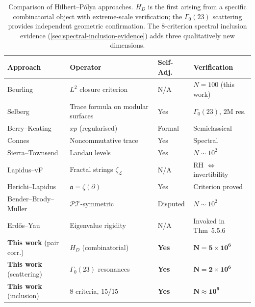\documentclass[11pt,a4paper]{article}
\theoremstyle{plain}
\theoremstyle{remark}
\begin{document}
\begin{table}[H]
\centering\small
\begin{tabular}{@{}llll@{}}
\toprule
Approach & Operator & Self-Adj. & Verification\\
\midrule
Beurling~\cite{beurling1955} & $L^2$ closure criterion & N/A & $N{=}100$ (this work)\\
Selberg~\cite{selberg1956} & Trace formula on modular surfaces & Yes & $\Gamma_0(23)$, $2\mathrm{M}$ res.\\
Berry--Keating~\cite{berry-keating1999} & $xp$ (regularised) & Formal & Semiclassical\\
Connes~\cite{connes1999} & Noncommutative trace & Yes & Spectral\\
Sierra--Townsend~\cite{sierra-townsend2008} & Landau levels & Yes & $N\sim 10^2$\\
Lapidus--vF~\cite{lapidus-vf2013} & Fractal strings $\zeta_{\mathcal L}$ & N/A & RH $\Leftrightarrow$ invertibility\\
Herichi--Lapidus~\cite{herichi-lapidus2019} & $\mathfrak{a}=\zeta(\partial)$ & Yes & Criterion proved\\
Bender--Brody--M\"uller~\cite{bender-brody-muller2017} & $\mathcal{PT}$-symmetric & Disputed & $N\sim 10^2$\\
Erd\H{o}s--Yau~\cite{erdos-yau2017} & Eigenvalue rigidity & N/A & Invoked in Thm~5.5.6\\
\textbf{This work} (pair corr.) & $H_D$ (combinatorial) & \textbf{Yes} & $\mathbf{N=5\times 10^6}$\\
\textbf{This work} (scattering) & $\Gamma_0(23)$ resonances & \textbf{Yes} & $\mathbf{N=2\times 10^6}$\\
\textbf{This work} (inclusion) & 8 criteria, 15/15 & \textbf{Yes} & $\mathbf{N\approx 10^6}$\\
\bottomrule
\end{tabular}
\caption{Comparison of Hilbert--P\'olya approaches.  $H_D$ is the first
  arising from a specific combinatorial object with extreme-scale
  verification; the $\Gamma_0(23)$ scattering provides independent
  geometric confirmation.  The 8-criterion spectral inclusion evidence
  (\cref{sec:spectral-inclusion-evidence}) adds three qualitatively
  new dimensions.}
\label{tab:prior}
\end{table}
\end{document}
